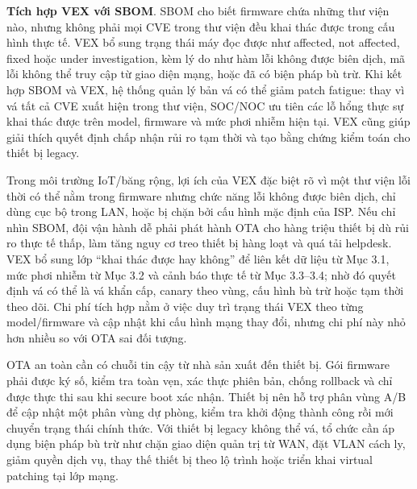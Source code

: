 \documentclass[../DoAn.tex]{subfiles}
\begin{document}
\textbf{Tích hợp VEX với SBOM}. SBOM cho biết firmware chứa những thư viện nào, nhưng không phải mọi CVE trong thư viện đều khai thác được trong cấu hình thực tế. VEX bổ sung trạng thái máy đọc được như affected, not affected, fixed hoặc under investigation, kèm lý do như hàm lỗi không được biên dịch, mã lỗi không thể truy cập từ giao diện mạng, hoặc đã có biện pháp bù trừ. Khi kết hợp SBOM và VEX, hệ thống quản lý bản vá có thể giảm patch fatigue: thay vì vá tất cả CVE xuất hiện trong thư viện, SOC/NOC ưu tiên các lỗ hổng thực sự khai thác được trên model, firmware và mức phơi nhiễm hiện tại. VEX cũng giúp giải thích quyết định chấp nhận rủi ro tạm thời và tạo bằng chứng kiểm toán cho thiết bị legacy.

Trong môi trường IoT/băng rộng, lợi ích của VEX đặc biệt rõ vì một thư viện lỗi thời có thể nằm trong firmware nhưng chức năng lỗi không được biên dịch, chỉ dùng cục bộ trong LAN, hoặc bị chặn bởi cấu hình mặc định của ISP. Nếu chỉ nhìn SBOM, đội vận hành dễ phải phát hành OTA cho hàng triệu thiết bị dù rủi ro thực tế thấp, làm tăng nguy cơ treo thiết bị hàng loạt và quá tải helpdesk. VEX bổ sung lớp ``khai thác được hay không'' để liên kết dữ liệu từ Mục 3.1, mức phơi nhiễm từ Mục 3.2 và cảnh báo thực tế từ Mục 3.3--3.4; nhờ đó quyết định vá có thể là vá khẩn cấp, canary theo vùng, cấu hình bù trừ hoặc tạm thời theo dõi. Chi phí tích hợp nằm ở việc duy trì trạng thái VEX theo từng model/firmware và cập nhật khi cấu hình mạng thay đổi, nhưng chi phí này nhỏ hơn nhiều so với OTA sai đối tượng.


OTA an toàn cần có chuỗi tin cậy từ nhà sản xuất đến thiết bị. Gói firmware phải được ký số, kiểm tra toàn vẹn, xác thực phiên bản, chống rollback và chỉ được thực thi sau khi secure boot xác nhận. Thiết bị nên hỗ trợ phân vùng A/B để cập nhật một phân vùng dự phòng, kiểm tra khởi động thành công rồi mới chuyển trạng thái chính thức. Với thiết bị legacy không thể vá, tổ chức cần áp dụng biện pháp bù trừ như chặn giao diện quản trị từ WAN, đặt VLAN cách ly, giảm quyền dịch vụ, thay thế thiết bị theo lộ trình hoặc triển khai virtual patching tại lớp mạng.
\end{document}
